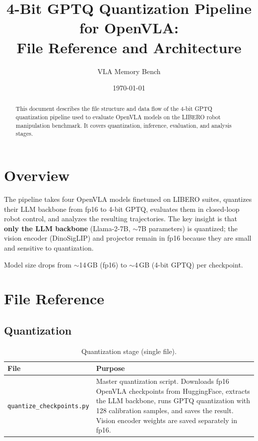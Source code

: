 \documentclass[11pt,a4paper]{article}
\title{4-Bit GPTQ Quantization Pipeline for OpenVLA:\\File Reference and Architecture}
\author{VLA Memory Bench}
\date{\today}
\begin{document}
\maketitle

\begin{abstract}
This document describes the file structure and data flow of the 4-bit GPTQ quantization pipeline used to evaluate OpenVLA models on the LIBERO robot manipulation benchmark. It covers quantization, inference, evaluation, and analysis stages.
\end{abstract}

\tableofcontents
\newpage

\section{Overview}

The pipeline takes four OpenVLA models finetuned on LIBERO suites, quantizes their LLM backbone from fp16 to 4-bit GPTQ, evaluates them in closed-loop robot control, and analyzes the resulting trajectories. The key insight is that \textbf{only the LLM backbone} (Llama-2-7B, $\sim$7B parameters) is quantized; the vision encoder (DinoSigLIP) and projector remain in fp16 because they are small and sensitive to quantization.

Model size drops from $\sim$14\,GB (fp16) to $\sim$4\,GB (4-bit GPTQ) per checkpoint.

\section{File Reference}

\subsection{Quantization}

\begin{table}[h]
\centering
\begin{tabular}{@{}p{5.5cm}p{9cm}@{}}
\toprule
\textbf{File} & \textbf{Purpose} \\
\midrule
\texttt{quantize\_checkpoints.py} & Master quantization script. Downloads fp16 OpenVLA checkpoints from HuggingFace, extracts the LLM backbone, runs GPTQ quantization with 128 calibration samples, and saves the result. Vision encoder weights are saved separately in fp16. \\
\bottomrule
\end{tabular}
\caption{Quantization stage (single file).}
\end{table}
\end{document}
